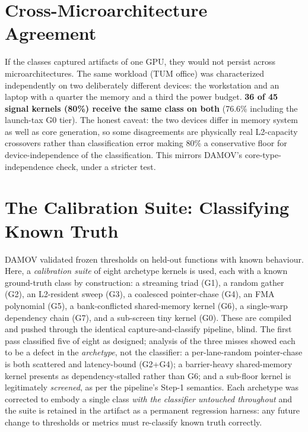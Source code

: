\section{Cross-Microarchitecture Agreement}
\label{sec:char-crossdev}

If the classes captured artifacts of one GPU, they would not persist across microarchitectures. The same workload (TUM office) was characterized independently on two deliberately different devices: the  workstation and an  laptop with a quarter the memory and a third the power budget. \textbf{36 of 45 signal kernels (80\%) receive the same class on both} (76.6\% including the launch-tax G0 tier). The honest caveat: the two devices differ in memory system as well as core generation, so some disagreements are physically real L2-capacity crossovers rather than classification error making 80\% a conservative floor for device-independence of the classification. This mirrors DAMOV's core-type-independence check, under a stricter test.

\section{The Calibration Suite: Classifying Known Truth}
\label{sec:char-calibration}

DAMOV validated frozen thresholds on held-out functions with known behaviour. Here, a \emph{calibration suite} of eight archetype kernels is used, each with a known ground-truth class by construction: a streaming triad (G1), a random gather (G2), an L2-resident sweep (G3), a coalesced pointer-chase (G4), an FMA polynomial (G5), a bank-conflicted shared-memory kernel (G6), a single-warp dependency chain (G7), and a sub-screen tiny kernel (G0). These are compiled and pushed through the identical capture-and-classify pipeline, blind. The first pass classified five of eight as designed; analysis of the three misses showed each to be a defect in the \emph{archetype}, not the classifier: a per-lane-random pointer-chase is both scattered and latency-bound (G2+G4); a barrier-heavy shared-memory kernel presents as dependency-stalled rather than G6; and a sub-floor kernel is legitimately \emph{screened}, as per the pipeline's Step-1 semantics. Each archetype was corrected to embody a single class \emph{with the classifier untouched throughout} and the suite is retained in the artifact as a permanent regression harness: any future change to thresholds or metrics must re-classify known truth correctly.

